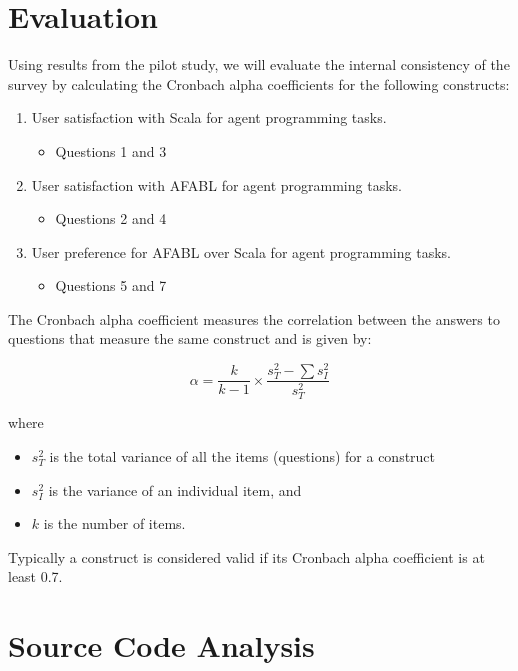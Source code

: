 \section{Evaluation}

Using results from the pilot study, we will evaluate the internal consistency of the survey by calculating the Cronbach alpha coefficients for the following constructs:

\begin{enumerate}

\item User satisfaction with Scala for agent programming tasks.
\begin{itemize}
\item Questions 1 and 3
\end{itemize}

\item User satisfaction with AFABL for agent programming tasks.
\begin{itemize}
\item  Questions 2 and 4
\end{itemize}

\item User preference for AFABL over Scala for agent programming tasks.
\begin{itemize}
\item Questions 5 and 7
\end{itemize}

\end{enumerate}

The Cronbach alpha coefficient measures the correlation between the answers to questions that measure the same construct and is given by:

\[
\alpha = \frac{k}{k - 1} \times \frac{s_{T}^{2} - \sum s_{I}^{2}}{s_{T}^{2}}
\]

where
\begin{itemize}
\item $s_T^2$ is the total variance of all the items (questions) for a construct
\item $s_I^2$ is the variance of an individual item, and
\item $k$ is the number of items.
\end{itemize}

Typically a construct is considered valid if its Cronbach alpha coefficient is at least 0.7.



\section{Source Code Analysis}

